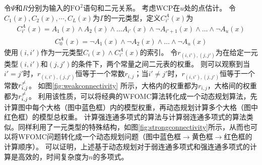 \documentclass[12pt,UTF8,AutoFakeBold=3,a4paper]{ctexart} %
\newcommand{\sentence}{\Gamma}
\newcommand{\wfomc}{WFOMC}
\newcommand\FOtwo{$\text{FO}^2$}
\newcommand\wcp{WCP}
\begin{document}
令$\Psi$和$R$分别为输入的\FOtwo{}语句和二元关系。
考虑\wcp{}在$u$处的点估计。
令$C_1(x), C_2(x), \cdots, C_L(x)$为$\sentence$的一元类型，定义$C^A_{i'}(x)$为
\begin{align*}
  C^A_{i'}(x) = A_1(x) \wedge A_2(x) \wedge \dots A_{i'}(x) \wedge \lnot A_{i'+1}(x) \wedge \dots \wedge \lnot A_u(x)
\end{align*}
\begin{align*}
  C^A_{0}(x) = \lnot A_1(x) \wedge \lnot A_2(x) \wedge \dots \wedge \lnot A_u(x)
\end{align*}
使用$(i,i')$作为一元类型$C_i(x) \wedge C^A_{i'}(x)$的索引。
令$r_{(i,i'),(j,j')}$为在给定一元类型$(i,i')$和$(j,j')$的条件下，两个常量之间二元表的权重。
则可以观察到当$i' = j'$时，$r_{(i,i'),(j,j')}$恒等于一个常数$r_{i,j}$；当$i' \neq j'$时，$r_{(i,i'),(j,j')}$恒等于一个常数$r^{\not-}_{i,j}$。
如图\ref{fig:weakconnectivity} 所示，大格内的权重都为$r_{i,j}$，大格间的权重都为$r^{\not-}_{i,j}$。
利用该性质，可以将经典的\wfomc{}算法转化成一个动态规划算法，先计算图中每个大格（图中蓝色框）内的模型权重，再动态规划计算多个大格（图中红色框）的模型总权重。
计算强连通多项式的算法与计算弱连通多项式的算法类似。同样利用了一元类型的特殊结构，如图\ref{fig:strongconnectivity}所示，从而也可以将\wfomc{}问题转化成一个动态规划问题（图中蓝色框$\to$黄色框$\to$红色框的计算顺序）。
可以证明，上述基于动态规划对于弱连通多项式和强连通多项式的计算是高效的，时间复杂度为$n$的多项式。
\end{document}
